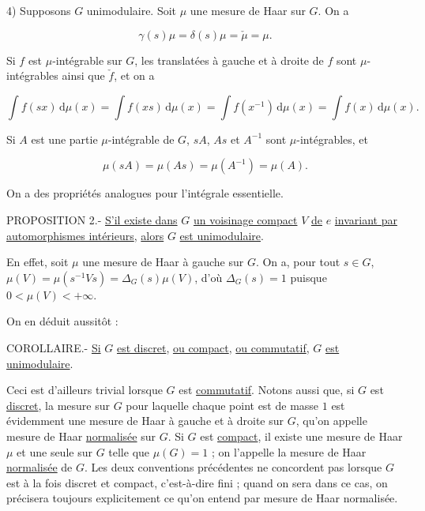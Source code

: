 4) Supposons $G$ unimodulaire. Soit $\mu$ une mesure de Haar sur $G$. On a

\[
\gamma(s)\mu=\delta(s)\mu=\check{\mu}=\mu. \tag*{(26)}
\]

Si $f$ est $\mu$-intégrable sur $G$, les translatées à gauche et à droite de $f$ sont $\mu$-intégrables ainsi que $\check f$, et on a

\[
\int f(sx)\,\mathrm{d}\mu(x)=\int f(xs)\,\mathrm{d}\mu(x)=\int f(x^{-1})\,\mathrm{d}\mu(x)=\int f(x)\,\mathrm{d}\mu(x). \tag*{(27)}
\]

Si $A$ est une partie $\mu$-intégrable de $G$, $sA$, $As$ et $A^{-1}$ sont $\mu$-intégrables, et

\[
\mu(sA)=\mu(As)=\mu(A^{-1})=\mu(A). \tag*{(28)}
\]


On a des propriétés analogues pour l'intégrale essentielle.

PROPOSITION 2.- \uline{S'il existe dans} $G$ \uline{un voisinage compact} $V$ \uline{de} $e$ \uline{invariant par automorphismes intérieurs}, \uline{alors} $G$ \uline{est unimodulaire}.

En effet, soit $\mu$ une mesure de Haar à gauche sur $G$. On a, pour tout $s\in G$, $\mu(V)=\mu(s^{-1}Vs)=\Delta_G(s)\mu(V)$, d'où $\Delta_G(s)=1$ puisque $0<\mu(V)<+\infty$.

On en déduit aussitôt :

COROLLAIRE.- \uline{Si} $G$ \uline{est discret}, \uline{ou compact}, \uline{ou commutatif}, $G$ \uline{est unimodulaire}.

Ceci est d'ailleurs trivial lorsque $G$ est \uline{commutatif}. Notons aussi que, si $G$ est \uline{discret}, la mesure sur $G$ pour laquelle chaque point est de masse $1$ est évidemment une mesure de Haar à gauche et à droite sur $G$, qu'on appelle mesure de Haar \uline{normalisée} sur $G$. Si $G$ est \uline{compact}, il existe une mesure de Haar $\mu$ et une seule sur $G$ telle que $\mu(G)=1$ ; on l'appelle la mesure de Haar \uline{normalisée} de $G$. Les deux conventions précédentes ne concordent pas lorsque $G$ est à la fois discret et compact, c'est-à-dire fini ; quand on sera dans ce cas, on précisera toujours explicitement ce qu'on entend par mesure de Haar normalisée.

